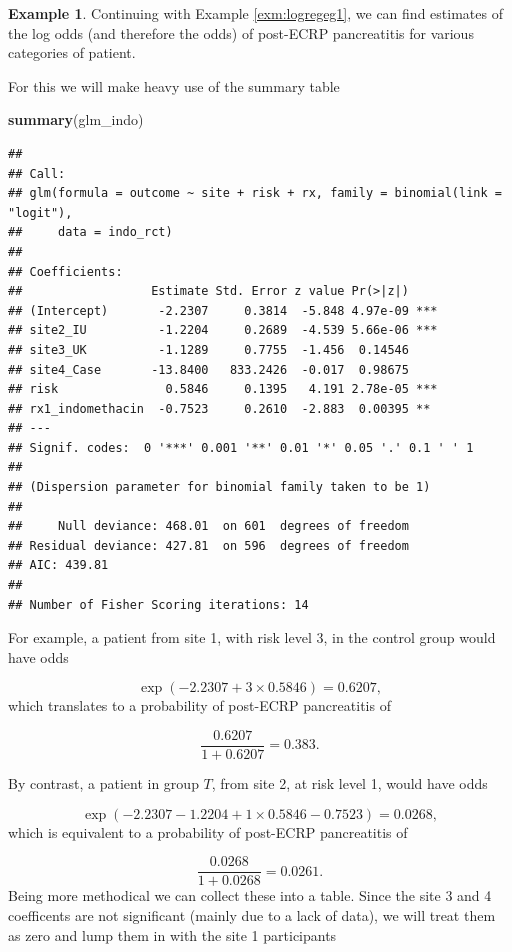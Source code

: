 \documentclass[
  openany]{book}
\newenvironment{Shaded}{\begin{snugshade}}{\end{snugshade}}
\newcommand{\FunctionTok}[1]{\textcolor[rgb]{0.13,0.29,0.53}{\textbf{#1}}}
\newcommand{\NormalTok}[1]{#1}
\theoremstyle{definition}
\theoremstyle{definition}
\newtheorem{example}{Example}[chapter]
\theoremstyle{definition}
\theoremstyle{definition}
\theoremstyle{remark}
\begin{document}
\begin{example}

Continuing with Example \ref{exm:logregeg1}, we can find estimates of the log odds (and therefore the odds) of post-ECRP pancreatitis for various categories of patient.

For this we will make heavy use of the summary table

\begin{Shaded}
\begin{Highlighting}[]
\FunctionTok{summary}\NormalTok{(glm\_indo)}
\end{Highlighting}
\end{Shaded}

\begin{verbatim}
## 
## Call:
## glm(formula = outcome ~ site + risk + rx, family = binomial(link = "logit"), 
##     data = indo_rct)
## 
## Coefficients:
##                  Estimate Std. Error z value Pr(>|z|)    
## (Intercept)       -2.2307     0.3814  -5.848 4.97e-09 ***
## site2_IU          -1.2204     0.2689  -4.539 5.66e-06 ***
## site3_UK          -1.1289     0.7755  -1.456  0.14546    
## site4_Case       -13.8400   833.2426  -0.017  0.98675    
## risk               0.5846     0.1395   4.191 2.78e-05 ***
## rx1_indomethacin  -0.7523     0.2610  -2.883  0.00395 ** 
## ---
## Signif. codes:  0 '***' 0.001 '**' 0.01 '*' 0.05 '.' 0.1 ' ' 1
## 
## (Dispersion parameter for binomial family taken to be 1)
## 
##     Null deviance: 468.01  on 601  degrees of freedom
## Residual deviance: 427.81  on 596  degrees of freedom
## AIC: 439.81
## 
## Number of Fisher Scoring iterations: 14
\end{verbatim}

For example, a patient from site 1, with risk level 3, in the control group would have odds

\[\exp\left(-2.2307 + 3\times 0.5846\right) = 0.6207, \]
which translates to a probability of post-ECRP pancreatitis of

\[\frac{0.6207}{1+0.6207} = 0.383. \]

By contrast, a patient in group \(T\), from site 2, at risk level 1, would have odds

\[\exp\left(-2.2307 - 1.2204 + 1\times 0.5846 - 0.7523\right) = 0.0268, \]
which is equivalent to a probability of post-ECRP pancreatitis of

\[\frac{0.0268}{1+0.0268} = 0.0261.\]
Being more methodical we can collect these into a table. Since the site 3 and 4 coefficents are not significant (mainly due to a lack of data), we will treat them as zero and lump them in with the site 1 participants


\end{example}
\end{document}
